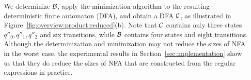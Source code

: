 We determinize $\mathcal{B}$, apply the minimization algorithm to the resulting deterministic finite automaton (DFA), and obtain a DFA $\mathcal{C}$, as illustrated in Figure~\ref{fig:overview:product:reduced}(b). 
Note that $\mathcal{C}$ contains only three states $q''_0, q''_1, q''_2$ and six transitions, while $\mathcal{B}$ contains four states and eight transitions. 
Although the determinization and minimization may not reduce the sizes of NFA in the worst case, the experimental results in Section~\ref{sec:implementation} show us that they do reduce the sizes of NFA that are  constructed from the regular expressions in practice. 


